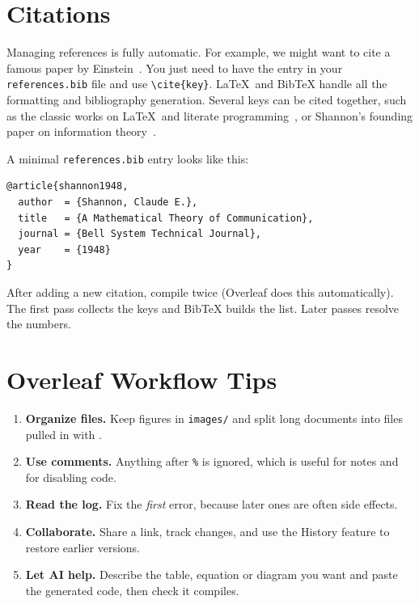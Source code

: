 \documentclass[12pt, a4paper]{article}
\theoremstyle{plain}
\theoremstyle{definition}
\newcommand{\term}[1]{\textbf{\textcolor{blue!60!black}{#1}}}
\begin{document}
\section{Citations}
Managing references is fully automatic. For example, we might want to cite a famous paper by Einstein~\cite{einstein1905}.
You just need to have the entry in your \texttt{references.bib} file and use \verb|\cite{key}|.
\LaTeX\ and BibTeX handle all the formatting and bibliography generation. Several keys can be cited together, such as the classic works on \LaTeX\ and literate programming~\cite{lamport1994, knuth1984, mittelbach2004}, or Shannon's founding paper on information theory~\cite{shannon1948}.

A minimal \texttt{references.bib} entry looks like this:
\begin{lstlisting}[language=TeX, caption={A BibTeX entry}]
@article{shannon1948,
  author  = {Shannon, Claude E.},
  title   = {A Mathematical Theory of Communication},
  journal = {Bell System Technical Journal},
  year    = {1948}
}
\end{lstlisting}

\begin{tipbox}
After adding a new citation, compile twice (Overleaf does this automatically). The first pass collects the keys and BibTeX builds the list. Later passes resolve the numbers.
\end{tipbox}

\section{Overleaf Workflow Tips}
\begin{enumerate}
    \item \term{Organize files.} Keep figures in \texttt{images/} and split long documents into files pulled in with \verb||.
    \item \term{Use comments.} Anything after \texttt{\%} is ignored, which is useful for notes and for disabling code.
    \item \term{Read the log.} Fix the \emph{first} error, because later ones are often side effects.
    \item \term{Collaborate.} Share a link, track changes, and use the History feature to restore earlier versions.
    \item \term{Let AI help.} Describe the table, equation or diagram you want and paste the generated code, then check it compiles.
\end{enumerate}
\end{document}
